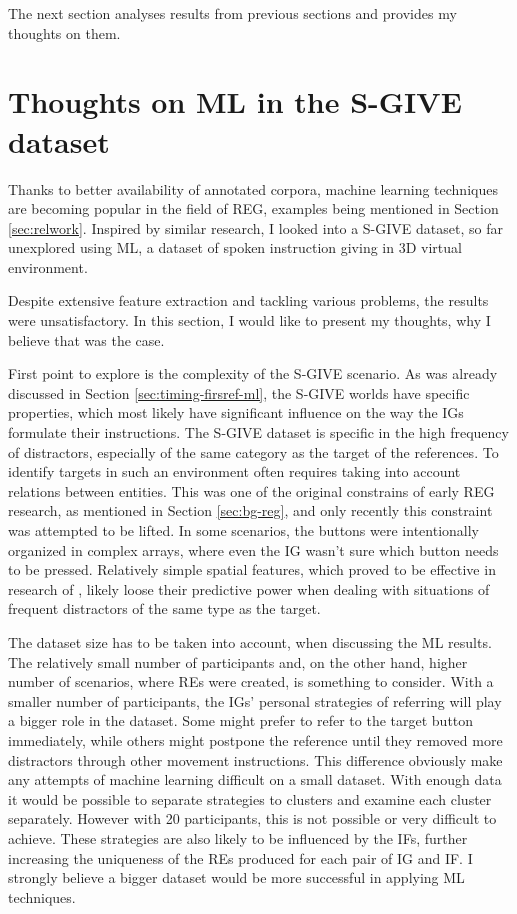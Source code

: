 The next section analyses results from previous sections and provides my thoughts on them.

\section{Thoughts on ML in the S-GIVE dataset}
Thanks to better availability of annotated corpora, machine learning techniques are becoming popular in the field of REG, examples being mentioned in Section \ref{sec:relwork}. Inspired by similar research, I looked into a S-GIVE dataset, so far unexplored using ML, a dataset of spoken instruction giving in 3D virtual environment.

Despite extensive feature extraction and tackling various problems, the results were unsatisfactory. In this section, I would like to present my thoughts, why I believe that was the case.

First point to explore is the complexity of the S-GIVE scenario. As was already discussed in Section \ref{sec:timing-firsref-ml}, the S-GIVE worlds have specific properties, which most likely have significant influence on the way the IGs formulate their instructions. The S-GIVE dataset is specific in the high frequency of distractors, especially of the same category as the target of the references. To identify targets in such an environment often requires taking into account relations between entities. This was one of the original constrains of early REG research, as mentioned in Section \ref{sec:bg-reg}, and only recently this constraint was attempted to be lifted. In some scenarios, the buttons were intentionally organized in complex arrays, where even the IG wasn't sure which button needs to be pressed. Relatively simple spatial features, which proved to be effective in research of \citet{stoia2006sentence}, likely loose their predictive power when dealing with situations of frequent distractors of the same type as the target.

The dataset size has to be taken into account, when discussing the ML results. The relatively small number of participants and, on the other hand, higher number of scenarios, where REs were created, is something to consider. With a smaller number of participants, the IGs' personal strategies of referring will play a bigger role in the dataset. Some might prefer to refer to the target button immediately, while others might postpone the reference until they removed more distractors through other movement instructions. This difference obviously make any attempts of machine learning difficult on a small dataset. With enough data it would be possible to separate strategies to clusters and examine each cluster separately. However with 20 participants, this is not possible or very difficult to achieve. These strategies are also likely to be influenced by the IFs, further increasing the uniqueness of the REs produced for each pair of IG and IF. I strongly believe a bigger dataset would be more successful in applying ML techniques.

